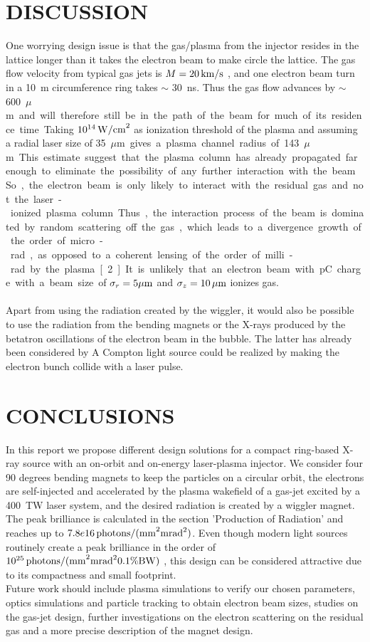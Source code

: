 \documentclass[a4paper,
              ]{jacow}
\begin{document}
\section{DISCUSSION}

One worrying design issue is that the gas/plasma from the injector resides in the lattice longer than it takes the electron beam to make circle the lattice. The gas flow velocity from typical gas jets is $M = 20\,\rm{km/s}$ \cite{GASFLOW}, and one electron beam turn in a \SI{10}{m} circumference ring takes $\sim$ \SI{30}{ns}.  Thus the gas flow advances by $\sim$\SI{600}{$\mu$m} and will therefore still be in the path of the beam for much of its residence time. Taking $10^{14}\,\rm{W/cm}^2$ as ionization threshold of the plasma and assuming a radial laser size of \SI{35}{$\mu$m} gives a plasma channel radius of \SI{143} {$\mu$m}. This estimate suggest that the plasma column has already propagated far enough to eliminate the possibility of any further interaction with the beam. So, the electron beam is only likely to interact with the residual gas and not the laser-ionized plasma column. Thus, the interaction process of the beam is dominated by random scattering off the gas, which leads to a divergence growth of the order of micro-rad, as opposed to a coherent lensing of the order of milli-rad by the plasma [2]. It is unlikely that an electron beam with pC charge with a beam size of $\sigma_r = 5\mu\rm{m}$ and $\sigma_z = 10\,\mu\rm{m}$ ionizes gas.\\
\\
Apart from using the radiation created by the wiggler, it would also be possible to use the radiation from the bending magnets or the X-rays produced by the betatron oscillations of the electron beam in the bubble. The latter has already been considered by \cite{PRODKEVS}
A Compton light source could be realized by making the electron bunch collide with a laser pulse.
\section{CONCLUSIONS}

In this report we propose different design solutions for a compact ring-based X-ray source with an on-orbit and on-energy laser-plasma injector. We consider four 90 degrees bending magnets to keep the particles on a circular orbit, the electrons are self-injected and accelerated by the plasma wakefield of a gas-jet excited by a \SI{400}{TW} laser system, and the desired radiation is created by a wiggler magnet. The peak brilliance is calculated in the section 'Production of Radiation' and reaches up to $7.8e16\,\rm{photons/(mm}^2 \rm{mrad}^2)$. Even though modern light sources routinely create a peak brilliance in the order of $10^{25}\,\rm{photons/(mm}^2 \rm{mrad}^2 0.1\%\rm{BW})$ \cite{DESY}, this design can be considered attractive due to its compactness and small footprint.\\
Future work should include plasma simulations to verify our chosen parameters, optics simulations and particle tracking to obtain electron beam sizes, studies on the gas-jet design, further investigations on the electron scattering on the residual gas and a more precise description of the magnet design.   
\end{document}
